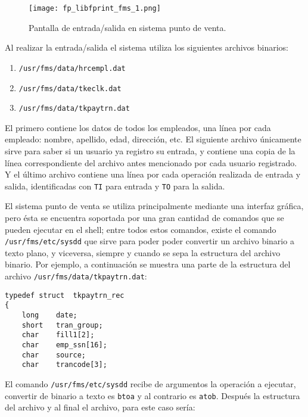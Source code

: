 \begin{figure}[htb]
 \begin{center}
  \texttt{[image: fp\_libfprint\_fms\_1.png]}
 \end{center}
 \caption{Pantalla de entrada/salida en sistema punto de venta.}
 \label{fig:finger_print_4}
\end{figure}

Al realizar la entrada/salida el sistema utiliza los siguientes archivos binarios: 

\begin{enumerate}
 \item \texttt{/usr/fms/data/hrcempl.dat}
 \item \texttt{/usr/fms/data/tkeclk.dat}
 \item \texttt{/usr/fms/data/tkpaytrn.dat}
\end{enumerate}


El primero contiene los datos de todos los empleados, una línea por cada empleado: nombre, apellido, edad, dirección, etc. El siguiente archivo únicamente sirve para saber si un usuario ya registro su entrada, y contiene una copia de la línea correspondiente del archivo antes mencionado por cada usuario registrado. Y el último archivo contiene una línea por cada operación realizada de entrada y salida, identificadas con \texttt{TI} para entrada y \texttt{TO} para la salida.

El sistema punto de venta se utiliza principalmente mediante una interfaz gráfica, pero ésta se encuentra soportada por una gran cantidad de comandos que se pueden ejecutar en el shell; entre todos estos comandos, existe el comando\\ \texttt{/usr/fms/etc/sysdd} que sirve para poder poder convertir un archivo binario a texto plano, y viceversa, siempre y cuando se sepa la estructura del archivo binario. Por ejemplo, a continuación se muestra una parte de la estructura del archivo \texttt{/usr/fms/data/tkpaytrn.dat}:

\begin{Verbatim}
typedef struct  tkpaytrn_rec
{
    long    date;
    short   tran_group;
    char    fill1[2];
    char    emp_ssn[16];
    char    source;
    char    trancode[3];
\end{Verbatim}

El comando \texttt{/usr/fms/etc/sysdd} recibe de argumentos la operación a ejecutar, convertir de binario a texto es \texttt{btoa} y al contrario es \texttt{atob}. Después la estructura del archivo y al final el archivo, para este caso sería: 

